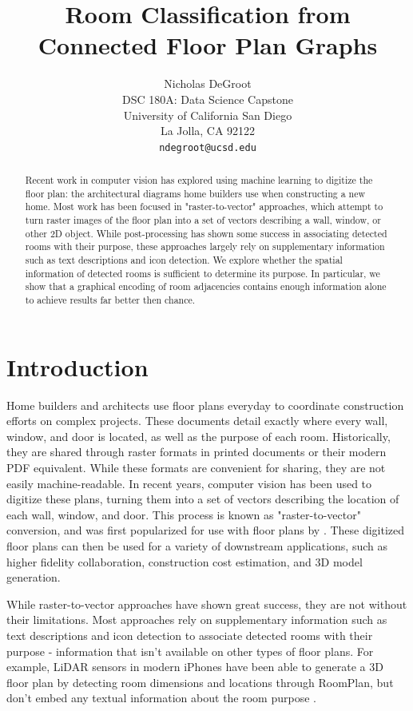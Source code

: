 \documentclass{article}
\title{Room Classification from Connected Floor Plan Graphs}
\author{
Nicholas DeGroot \\
DSC 180A: Data Science Capstone \\
University of California San Diego\\
La Jolla, CA 92122 \\
\texttt{ndegroot@ucsd.edu}
}
\begin{document}
\maketitle

\begin{abstract}

    Recent work in computer vision has explored using machine learning to digitize the floor plan: the architectural diagrams home builders use when constructing a new home. Most work has been focused in "raster-to-vector" approaches, which attempt to turn raster images of the floor plan into a set of vectors describing a wall, window, or other 2D object. While post-processing has shown some success in associating detected rooms with their purpose, these approaches largely rely on supplementary information such as text descriptions and icon detection. We explore whether the spatial information of detected rooms is sufficient to determine its purpose. In particular, we show that a graphical encoding of room adjacencies contains enough information alone to achieve results far better then chance.
    
\end{abstract}

\section{Introduction}

Home builders and architects use floor plans everyday to coordinate construction efforts on complex projects. These documents detail exactly where every wall, window, and door is located, as well as the purpose of each room. Historically, they are shared through raster formats in printed documents or their modern PDF equivalent. While these formats are convenient for sharing, they are not easily machine-readable. In recent years, computer vision has been used to digitize these plans, turning them into a set of vectors describing the location of each wall, window, and door. This process is known as "raster-to-vector" conversion, and was first popularized for use with floor plans by \citet{rastertovec2017}. These digitized floor plans can then be used for a variety of downstream applications, such as higher fidelity collaboration, construction cost estimation, and 3D model generation.

While raster-to-vector approaches have shown great success, they are not without their limitations. Most approaches rely on supplementary information such as text descriptions and icon detection to associate detected rooms with their purpose - information that isn't available on other types of floor plans. For example, LiDAR sensors in modern iPhones have been able to generate a 3D floor plan by detecting room dimensions and locations through RoomPlan, but don't embed any textual information about the room purpose \cite{appleroomplan}.
\end{document}

